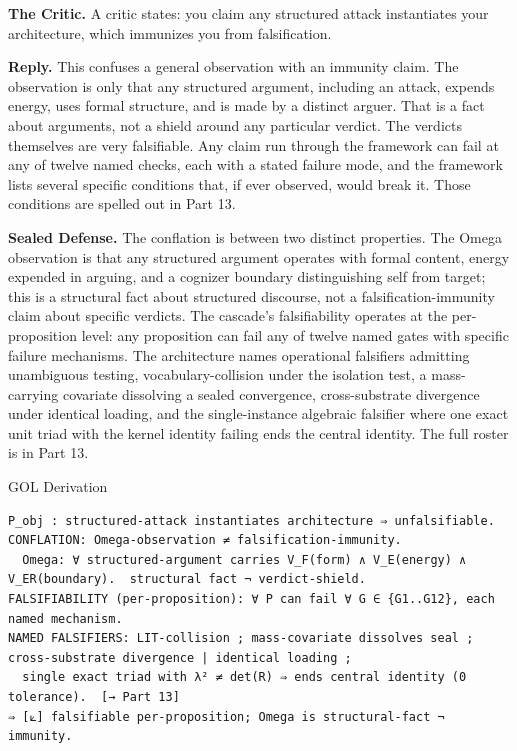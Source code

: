 \documentclass[10pt,twocolumn]{article}
\begin{document}
\textbf{The Critic.} A critic states: you claim any structured attack
instantiates your architecture, which immunizes you from falsification.

\textbf{Reply.} This confuses a general observation with an immunity
claim. The observation is only that any structured argument, including
an attack, expends energy, uses formal structure, and is made by a
distinct arguer. That is a fact about arguments, not a shield around any
particular verdict. The verdicts themselves are very falsifiable. Any
claim run through the framework can fail at any of twelve named checks,
each with a stated failure mode, and the framework lists several
specific conditions that, if ever observed, would break it. Those
conditions are spelled out in Part 13.

\textbf{Sealed Defense.} The conflation is between two distinct
properties. The Omega observation is that any structured argument
operates with formal content, energy expended in arguing, and a cognizer
boundary distinguishing self from target; this is a structural fact
about structured discourse, not a falsification-immunity claim about
specific verdicts. The cascade's falsifiability operates at the
per-proposition level: any proposition can fail any of twelve named
gates with specific failure mechanisms. The architecture names
operational falsifiers admitting unambiguous testing,
vocabulary-collision under the isolation test, a mass-carrying covariate
dissolving a sealed convergence, cross-substrate divergence under
identical loading, and the single-instance algebraic falsifier where one
exact unit triad with the kernel identity failing ends the central
identity. The full roster is in Part 13.

\begin{golbox}{GOL Derivation}
\begin{lstlisting}[style=golv]
P_obj : structured-attack instantiates architecture ⇒ unfalsifiable.
CONFLATION: Omega-observation ≠ falsification-immunity.
  Omega: ∀ structured-argument carries V_F(form) ∧ V_E(energy) ∧ V_ER(boundary).  structural fact ¬ verdict-shield.
FALSIFIABILITY (per-proposition): ∀ P can fail ∀ G ∈ {G1..G12}, each named mechanism.
NAMED FALSIFIERS: LIT-collision ; mass-covariate dissolves seal ; cross-substrate divergence | identical loading ;
  single exact triad with λ² ≠ det(R) ⇒ ends central identity (0 tolerance).  [→ Part 13]
⇒ [⟀] falsifiable per-proposition; Omega is structural-fact ¬ immunity.
\end{lstlisting}
\end{golbox}
\end{document}
